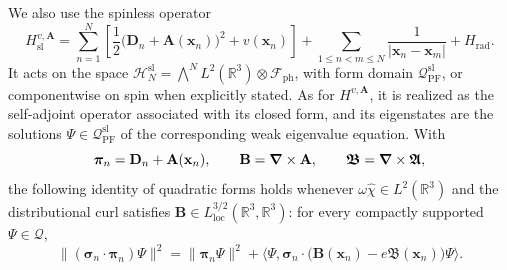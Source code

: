 \documentclass[final,reqno]{amsart}
\theoremstyle{remark}
\newcommand{\RR}{\mathbb{R}}
\newcommand{\dua}[2]{\langle #1, #2 \rangle}
\newcommand{\HC}{\mathcal{H}}
\newcommand{\AF}{\bm{\mathfrak{A}}}
\newcommand{\BF}{\bm{\mathfrak{B}}}
\newcommand{\PF}{\mathrm{PF}}
\newcommand{\ph}{\mathrm{ph}}
\newcommand{\rad}{\mathrm{rad}}
\newcommand{\Fock}{\mathcal{F}}
\newcommand{\vsigma}{{\bm{\sigma}}}
\newcommand{\vpi}{{\bm{\pi}}}
\newcommand{\vx}{\mathbf{x}}
\newcommand{\vA}{{\mathbf{A}}}
\newcommand{\vB}{{\mathbf{B}}}
\newcommand{\vD}{{\mathbf{D}}}
\newcommand{\wh}[1]{\widehat{#1}}
\begin{document}
We also use the spinless operator
\begin{equation*}
 H_{\mathrm{sl}}^{v,\vA}
 =\sum_{n=1}^N\left[\frac12\big(\vD_n+\vA(\vx_n)\big)^2+v(\vx_n)\right]
   +\sum_{1\leq n<m\leq N}\frac1{|\vx_n-\vx_m|}+H_\rad.
\end{equation*}
It acts on the space
$\HC_N^{\mathrm{sl}}=\bigwedge^N L^2(\RR^3)\otimes\Fock_\ph$,
with form domain $\mathcal Q_\PF^{\mathrm{sl}}$, or componentwise on spin
when explicitly stated.  As for $H^{v,\vA}$, it is realized as the
self-adjoint operator associated with its closed form, and its
eigenstates are the solutions $\Psi\in\mathcal Q_\PF^{\mathrm{sl}}$ of the
corresponding weak eigenvalue equation.  With
\[
 \vpi_n=\vD_n+\vA(\vx_n),\qquad
 \vB=\grad\times\vA,\qquad
 \BF=\grad\times\AF,
\]
the following identity of quadratic forms holds whenever
$\omega\wh\chi\in L^2(\RR^3)$ and the distributional curl satisfies
$\vB\in L^{3/2}_\mathrm{loc}(\RR^3,\RR^3)$: for every
compactly supported $\Psi\in\mathcal Q$,
\begin{equation}\label{pauli-expansion}
 \|(\vsigma_n\cdot\vpi_n)\Psi\|^2
 =\|\vpi_n\Psi\|^2
   +\dua{\Psi}{\vsigma_n\cdot\bigl(\vB(\vx_n)-e\BF(\vx_n)\bigr)\Psi}.
\end{equation}
\end{document}
